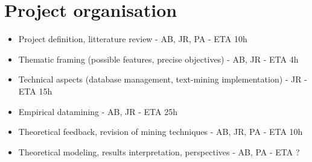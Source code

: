 \section{Project organisation}


\begin{itemize}
\item Project definition, litterature review - AB, JR, PA - ETA 10h
\item Thematic framing (possible features, precise objectives) - AB, JR - ETA 4h
\item Technical aspects (database management, text-mining implementation) - JR - ETA 15h
\item Empirical datamining - AB, JR - ETA 25h
\item Theoretical feedback, revision of mining techniques - AB, JR, PA - ETA 10h
\item Theoretical modeling, results interpretation, perspectives - AB, PA - ETA ?
\end{itemize}





















